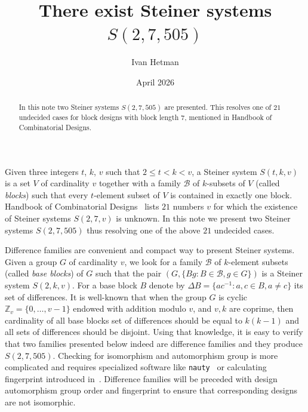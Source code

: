 \documentclass{amsart}
\title{There exist Steiner systems $S(2,7,505)$}
\author{Ivan Hetman}
\date{April 2026}
\theoremstyle{plain}
\theoremstyle{definition}
\theoremstyle{remark}
\newcommand{\IZ}{\mathbb Z}
\begin{document}
    \begin{abstract} In this note two Steiner systems $S(2,7,505)$ are presented. This resolves one of $21$ undecided cases for block designs with block length $7$, mentioned in Handbook of Combinatorial Designs.
    \end{abstract}

    \maketitle

    Given three integers $t$, $k$, $v$ such that $2 \le t < k < v$, a Steiner system $S(t, k, v)$ is a set $V$ of cardinality $v$ together with a family $\mathcal B$ of $k$-subsets of $V$ (called \textit{blocks}) such that every $t$-element subset of $V$ is contained in exactly one block.
    Handbook of Combinatorial Designs~\cite[II.3.5-6]{HoCD} lists $21$ numbers $v$ for which the existence of Steiner systems $S(2,7,v)$ is unknown.
    In this note we present two Steiner systems $S(2,7,505)$ thus resolving one of the above $21$ undecided cases.

    Difference families are convenient and compact way to present Steiner systems.
    Given a group $G$ of cardinality $v$, we look for a family $\mathcal B$ of $k$-element subsets (called \emph{base blocks}) of $G$ such that the pair $(G, \{Bg:B\in\mathcal B,g\in G\})$ is a Steiner system $S(2,k,v)$.
    For a base block $B$ denote by $\Delta B=\{ac^{-1}:a,c\in B, a\not= c\}$ its set of differences.
    It is well-known that when the group $G$ is cyclic $\IZ_v=\{0,\dots,v-1\}$ endowed with addition modulo $v$, and $v,k$ are coprime, then cardinality of all base blocks set of differences should be equal to $k(k-1)$ and all sets of differences should be disjoint.
    Using that knowledge, it is easy to verify that two families presented below indeed are difference families and they produce $S(2,7,505)$.
    Checking for isomorphism and automorphism group is more complicated and requires specialized software like \texttt{nauty}~\cite{nauty} or calculating fingerprint introduced in~\cite{Het}.
    Difference families will be preceded with design automorphism group order and fingerprint to ensure that corresponding designs are not isomorphic.
\end{document}
